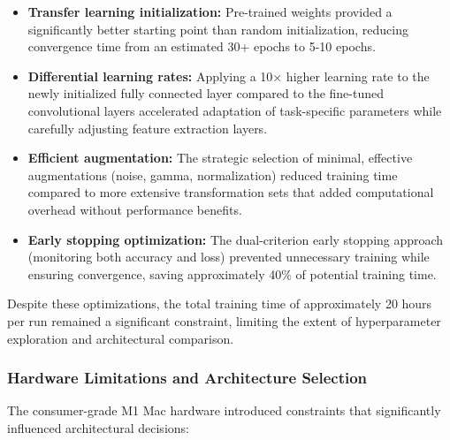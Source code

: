 \documentclass[12pt, a4paper]{article}
\begin{document}
\begin{itemize}
    \item \textbf{Transfer learning initialization:} Pre-trained weights provided a significantly better starting point than random initialization, reducing convergence time from an estimated 30+ epochs to 5-10 epochs.
    
    \item \textbf{Differential learning rates:} Applying a 10× higher learning rate to the newly initialized fully connected layer compared to the fine-tuned convolutional layers accelerated adaptation of task-specific parameters while carefully adjusting feature extraction layers.
    
    \item \textbf{Efficient augmentation:} The strategic selection of minimal, effective augmentations (noise, gamma, normalization) reduced training time compared to more extensive transformation sets that added computational overhead without performance benefits.
    
    \item \textbf{Early stopping optimization:} The dual-criterion early stopping approach (monitoring both accuracy and loss) prevented unnecessary training while ensuring convergence, saving approximately 40\% of potential training time.
\end{itemize}

Despite these optimizations, the total training time of approximately 20 hours per run remained a significant constraint, limiting the extent of hyperparameter exploration and architectural comparison.

\subsubsection{Hardware Limitations and Architecture Selection}

The consumer-grade M1 Mac hardware introduced constraints that significantly influenced architectural decisions:
\end{document}
